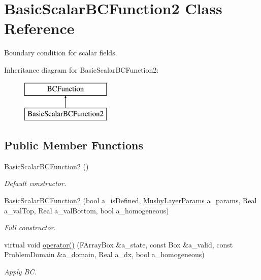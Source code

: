 \hypertarget{class_basic_scalar_b_c_function2}{\section{Basic\-Scalar\-B\-C\-Function2 Class Reference}
\label{class_basic_scalar_b_c_function2}
}


Boundary condition for scalar fields.  


Inheritance diagram for Basic\-Scalar\-B\-C\-Function2\-:\begin{figure}[H]
\begin{center}
\leavevmode
\includegraphics[height=2.000000cm]{class_basic_scalar_b_c_function2}
\end{center}
\end{figure}
\subsection*{Public Member Functions}
\begin{DoxyCompactItemize}
\item 
\hypertarget{class_basic_scalar_b_c_function2_a635785993c7e5ad265309e909340e02a}{\hyperlink{class_basic_scalar_b_c_function2_a635785993c7e5ad265309e909340e02a}{Basic\-Scalar\-B\-C\-Function2} ()}\label{class_basic_scalar_b_c_function2_a635785993c7e5ad265309e909340e02a}

\begin{DoxyCompactList}\small\item\em Default constructor. \end{DoxyCompactList}\item 
\hypertarget{class_basic_scalar_b_c_function2_ae04fb59164364a57d0fae62e2ce7e88f}{\hyperlink{class_basic_scalar_b_c_function2_ae04fb59164364a57d0fae62e2ce7e88f}{Basic\-Scalar\-B\-C\-Function2} (bool a\-\_\-is\-Defined, \hyperlink{class_mushy_layer_params}{Mushy\-Layer\-Params} a\-\_\-params, Real a\-\_\-val\-Top, Real a\-\_\-val\-Bottom, bool a\-\_\-homogeneous)}\label{class_basic_scalar_b_c_function2_ae04fb59164364a57d0fae62e2ce7e88f}

\begin{DoxyCompactList}\small\item\em Full constructor. \end{DoxyCompactList}\item 
\hypertarget{class_basic_scalar_b_c_function2_a00d821f789c27563ff42f038393b1055}{virtual void \hyperlink{class_basic_scalar_b_c_function2_a00d821f789c27563ff42f038393b1055}{operator()} (F\-Array\-Box \&a\-\_\-state, const Box \&a\-\_\-valid, const Problem\-Domain \&a\-\_\-domain, Real a\-\_\-dx, bool a\-\_\-homogeneous)}\label{class_basic_scalar_b_c_function2_a00d821f789c27563ff42f038393b1055}

\begin{DoxyCompactList}\small\item\em Apply B\-C. \end{DoxyCompactList}\end{DoxyCompactItemize}
